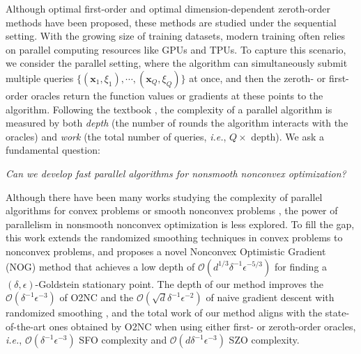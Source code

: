 \documentclass{article}
\def\vx{{\bm{x}}}
\def\gO{{\mathcal{O}}}
\theoremstyle{definition}
\theoremstyle{remark}
\begin{document}
	
	Although optimal first-order \citep{cutkosky2023optimal} and optimal dimension-dependent zeroth-order methods \citep{kornowski2024algorithm} have been proposed, these methods are studied under the sequential setting. 
	With the growing size of training datasets, modern training often relies on parallel computing resources like GPUs and TPUs. To capture this scenario, we 
	consider the parallel setting, where the algorithm can simultaneously submit multiple queries $\{(\vx_1,\xi_1),\cdots, (\vx_Q,\xi_Q) \}$ at once, and then the zeroth- or first-order oracles return the function values or gradients at these points to the algorithm. Following the textbook \citep{nemirovski1994parallel}, the complexity of a parallel algorithm is measured by both \textit{depth} (the number of rounds the algorithm interacts with the oracles) and \textit{work} (the total number of queries, \textit{i.e.}, $Q \times$ depth). We ask a fundamental question:
	\begin{center}
		\textit{Can we develop fast parallel algorithms for nonsmooth nonconvex optimization?}
	\end{center}
	Although there have been many works studying the complexity of parallel algorithms for convex problems \citep{duchi2012randomized,bubeck2019complexity,diakonikolas2019lower,balkanski2018parallelization,jambulapati2024closing,carmon2023resqueing,scaman2018optimal,garg2020no,garg2021near,sidford2023quantum} or smooth nonconvex problems \citep{zhang2023quantum,zhou2025adaptive}, the power of parallelism in nonsmooth nonconvex optimization is less explored. 
	To fill the gap, this work extends the randomized smoothing techniques in convex problems \citep{duchi2012randomized} to nonconvex problems, and proposes a novel Nonconvex Optimistic Gradient (NOG) method that achieves a low depth of $\gO(d^{1/3} \delta^{-1} \epsilon^{-5/3})$ for finding a $(\delta,\epsilon)$-Goldstein stationary point. The depth of our method improves the $\gO(\delta^{-1} \epsilon^{-3})$ of O2NC \citep{cutkosky2023optimal,kornowski2024algorithm} and the $\gO(\sqrt{d} \delta^{-1} \epsilon^{-2})$ of naive gradient descent with randomized smoothing \citep{lin2022gradient,jordan2023deterministic,chen2023faster}, and the total work of our method aligns with the state-of-the-art ones obtained by O2NC \citep{cutkosky2023optimal,kornowski2024algorithm} when using either first- or zeroth-order oracles, \textit{i.e.}, $\gO(\delta^{-1} \epsilon^{-3} )$ SFO complexity and $\gO(d \delta^{-1} \epsilon^{-3})$ SZO complexity.
\end{document}
